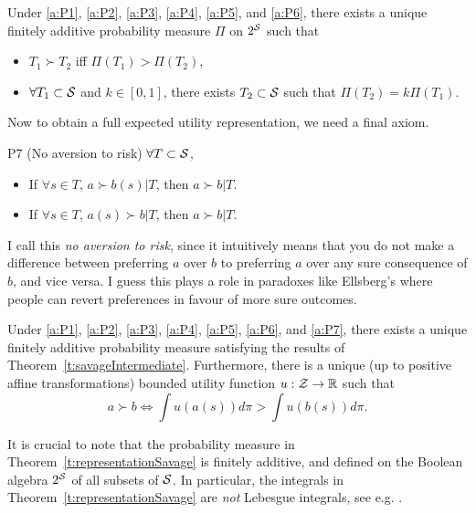 \begin{theorem}
Under \ref{a:P1}, \ref{a:P2}, \ref{a:P3}, \ref{a:P4}, \ref{a:P5}, and \ref{a:P6}, there exists a unique finitely additive probability measure $\Pi$ on $2^{\mathcal{S}}$ such that
\begin{itemize}
\item $T_1\succ T_2$ iff $\Pi(T_1)>\Pi(T_2)$,
\item $\forall T_1\subset \mathcal{S}$ and $k\in[0,1]$, there exists $T_2\subset \mathcal{S}$ such that
$\Pi(T_2) = k\Pi(T_1)$.
\end{itemize}
\label{t:savageIntermediate}
\end{theorem}

Now to obtain a full expected utility representation, we need a final axiom.
\begin{axiom}{P7 (No aversion to risk)}\label{a:P7}
$\forall T\subset\mathcal{S}$,
\begin{itemize}
\item If $\forall s\in T$, $a\succ b(s)\vert T$, then $a\succ b\vert T$.
\item If $\forall s\in T$, $a(s)\succ b\vert T$, then $a\succ b\vert T$.
\end{itemize}
\end{axiom}
I call this \emph{no aversion to risk}, since it intuitively means that you do not make a difference between preferring $a$ over $b$ to preferring $a$ over any sure consequence of $b$, and vice versa. I guess this plays a role in paradoxes like Ellsberg's where people can revert preferences in favour of more sure outcomes.
\begin{theorem}
Under \ref{a:P1}, \ref{a:P2}, \ref{a:P3}, \ref{a:P4}, \ref{a:P5}, \ref{a:P6}, and \ref{a:P7}, there exists a unique finitely additive probability measure satisfying the results of Theorem~\ref{t:savageIntermediate}. Furthermore, there is a unique (up to positive affine transformations) bounded utility function $u:\mathcal{Z}\rightarrow \mathbb{R}$ such that
$$ a\succ b \Leftrightarrow \int u(a(s))d\pi > \int u(b(s))d\pi.$$
\label{t:representationSavage}
\end{theorem}
It is crucial to note that the probability measure in Theorem~\ref{t:representationSavage} is finitely additive, and defined on the Boolean algebra $2^{\mathcal{S}}$ of all subsets of $\mathcal{S}$. In particular, the integrals in Theorem~\ref{t:representationSavage} are \emph{not} Lebesgue integrals, see e.g. \cite{Kre88}.

